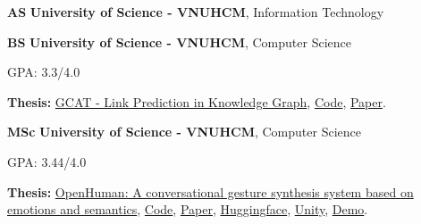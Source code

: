 

\begin{threecolentry}{\textbf{AS}}{
	}
	\textbf{University of Science - VNUHCM}, Information Technology
\end{threecolentry}

\begin{threecolentry}{\textbf{BS}}{
	}
	\textbf{University of Science - VNUHCM}, Computer Science
	\begin{highlights}
		\item GPA: 3.3/4.0
		\item \textbf{Thesis:} \href{https://hmthanh.github.io/file/Link_Prediction_In_Knowledge_Graph.pdf}{GCAT - Link Prediction in Knowledge Graph}, \href{https://github.com/hmthanh/GCAT}{Code},  \href{https://hmthanh.github.io/file/Graph%20Collaborative%20Attention%20Network%20for%20Link%20Prediction%20in%20Knowledge%20Graphs.pdf}{Paper}.
		
	\end{highlights}
\end{threecolentry}

\begin{threecolentry}{\textbf{MSc}}{
	}
	\textbf{University of Science - VNUHCM}, Computer Science
	\begin{highlights}
		\item GPA: 3.44/4.0
		\item \textbf{Thesis:} \href{https://hmthanh.github.io/file/OpenHuman-A_conversational_gesture_synthesis_system_based_on_emotions_and_semantics.pdf}{OpenHuman: A conversational gesture synthesis system based on emotions and semantics},
		\href{https://github.com/hmthanh/OHGesture}{Code},
		\href{https://hmthanh.github.io/file/DeepGesture\%20-\%20A\%20conversational\%20gesture\%20synthesis\%20system\%20based\%20on\%20emotions\%20and\%20semantics.pdf}{\textnormal{Paper}},
		 \href{https://huggingface.co/openhuman/openhuman}{Huggingface}, \href{https://github.com/DeepGesture/deepgesture-unity}{Unity}, \href{https://youtu.be/yLwXdm7UgPE}{Demo}.
	\end{highlights}
\end{threecolentry}